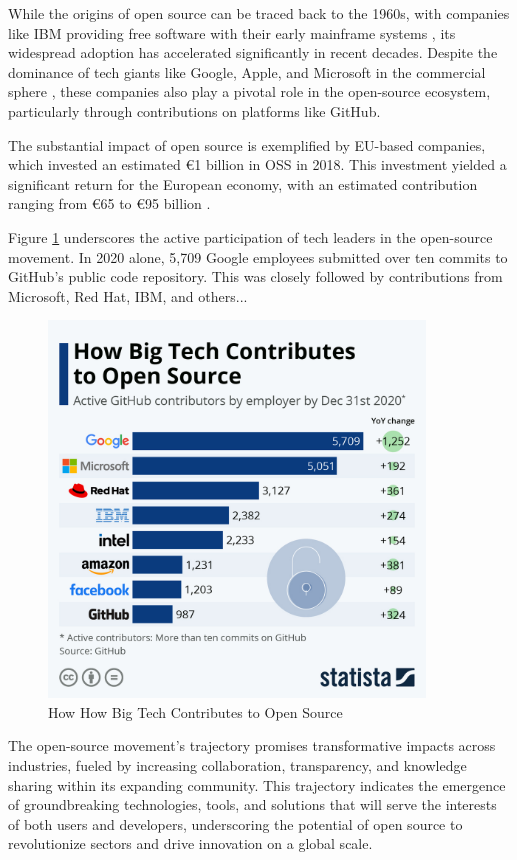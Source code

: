 While the origins of open source can be traced back to the 1960s, with companies like IBM providing free software with their early mainframe systems \cite{moreno2006open}, its widespread adoption has accelerated significantly in recent decades.  Despite the dominance of tech giants like Google, Apple, and Microsoft in the commercial sphere \cite{jacobides2020regulating}, these companies also play a pivotal role in the open-source ecosystem, particularly through contributions on platforms like GitHub.

The substantial impact of open source is exemplified by EU-based companies, which invested an estimated €1 billion in OSS in 2018. This investment yielded a significant return for the European economy, with an estimated contribution ranging from €65 to €95 billion \cite{blind2021impact}.

Figure \ref{fig:bigtechcontributes} underscores the active participation of tech leaders in the open-source movement.  In 2020 alone, 5,709 Google employees submitted over ten commits to GitHub's public code repository.  This was closely followed by contributions from Microsoft, Red Hat, IBM, and others...

\begin{figure}[ht]
    \includegraphics[width=10cm]{figs/bigtechcontributes.jpeg}
    \centering
    \caption{How How Big Tech Contributes to Open Source \cite{statista2021bigtechopensource}}
    \label{fig:bigtechcontributes}
\end{figure}

The open-source movement's trajectory promises transformative impacts across industries, fueled by increasing collaboration, transparency, and knowledge sharing within its expanding community. This trajectory indicates the emergence of groundbreaking technologies, tools, and solutions that will serve the interests of both users and developers, underscoring the potential of open source to revolutionize sectors and drive innovation on a global scale.


